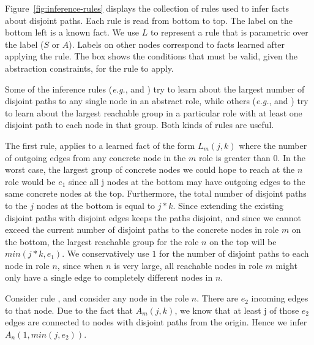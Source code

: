\documentclass[numbers, 10pt]{sigplanconf}
\newcommand{\EG}{\emph{e.g.}}
\begin{document}
Figure~\ref{fig:inference-rules} displays the collection of rules used to infer facts about disjoint paths.
Each rule is read from bottom to top. The label on the bottom left is a known fact. We use $L$ to represent a rule that is parametric over the label ($S$ or $A$). Labels on other nodes correspond to facts learned after applying the rule. The box shows the conditions that must be valid, given the abstraction constraints, for the rule to apply. 

Some of the inference rules (\EG,  and ) try to learn about the largest number of disjoint paths to any single node in an abstract role, while others (\EG,  and ) try to learn about the largest reachable group in a particular role with at least one disjoint path to each node in that group. Both kinds of rules are useful. 

The first rule,  applies to a learned fact of the form $L_m(j,k)$ where the number of outgoing edges from any concrete node in the $m$ role is greater than 0. In the worst case, the largest group of concrete nodes we could hope to reach at the $n$ role would be $e_1$ since all j nodes at the bottom may have outgoing edges to the same concrete nodes at the top. Furthermore, the total number of disjoint paths to the $j$ nodes at the bottom is equal to $j*k$. Since extending the existing disjoint paths with disjoint edges keeps the paths disjoint, and since we cannot exceed the current number of disjoint paths to the concrete nodes in role $m$ on the bottom, the largest reachable group for the role $n$ on the top will be $min(j*k,e_1)$.
%
We conservatively use $1$ for the number of disjoint paths to each node in role $n$, since when $n$ is very large, all reachable nodes in role $m$ might only have a single edge to completely different nodes in $n$.

Consider rule , and consider any node in the role $n$. There are $e_2$ incoming edges to that node. Due to the fact that $A_m(j,k)$, we know that at least j of those $e_2$ edges are connected to nodes with disjoint paths from the origin. Hence we infer $A_n(1,min(j,e_2))$.
\end{document}
